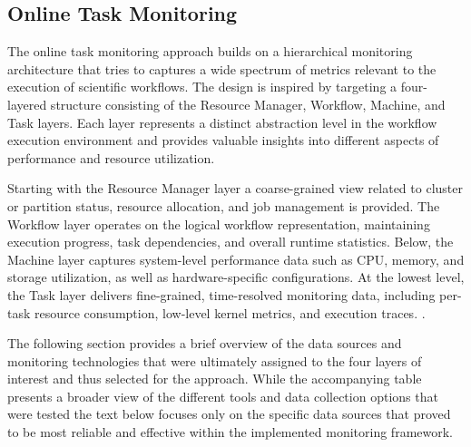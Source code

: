 \subsection{Online Task Monitoring}
\label{sec:online_task_monitoring}

The online task monitoring approach builds on a hierarchical monitoring architecture that tries to captures a wide spectrum of metrics relevant to the execution of scientific workflows. The design is inspired by \cite{Bader_2022} targeting a four-layered structure consisting of the Resource Manager, Workflow, Machine, and Task layers. Each layer represents a distinct abstraction level in the workflow execution environment and provides valuable insights into different aspects of performance and resource utilization.

Starting with the Resource Manager layer a coarse-grained view related to cluster or partition status, resource allocation, and job management is provided. The Workflow layer operates on the logical workflow representation, maintaining execution progress, task dependencies, and overall runtime statistics. Below, the Machine layer captures system-level performance data such as CPU, memory, and storage utilization, as well as hardware-specific configurations. At the lowest level, the Task layer delivers fine-grained, time-resolved monitoring data, including per-task resource consumption, low-level kernel metrics, and execution traces.
\cite{Bader_2022}.

The following section provides a brief overview of the data sources and monitoring technologies that were ultimately assigned to the four layers of interest and thus selected for the approach. While the accompanying table presents a broader view of the different tools and data collection options that were tested the text below focuses only on the specific data sources that proved to be most reliable and effective within the implemented monitoring framework.

